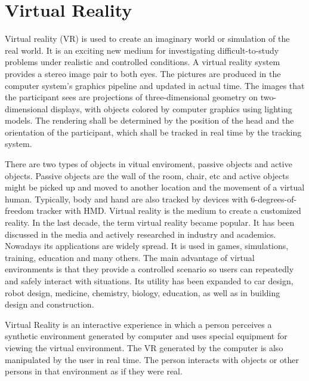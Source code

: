 \section{Virtual Reality}
Virtual reality (VR) is used to create an imaginary world or simulation of the real world. It is an exciting new medium for investigating difficult-to-study problems under realistic and controlled conditions. A virtual reality system provides a stereo image pair to both eyes. The pictures are produced in the computer system's graphics pipeline and updated in actual time. The images that the participant sees are projections of three-dimensional geometry on two-dimensional displays, with objects colored by computer graphics using lighting models. The rendering shall be determined by the position of the head and the orientation of the participant, which shall be tracked in real time by the tracking system.\cite{mandal2013brief}\par
There are two types of objects in vitual enviroment, passive objects and active objects. Passive objects are the wall of the room, chair, etc and active objects might be picked up and moved to another location and the movement of a virtual human. Typically, body and hand are also tracked by devices with 6-degrees-of-freedom tracker with HMD.
Virtual reality is the medium to create a customized reality. In the last decade, the term virtual reality became popular. It has been discussed in the media and actively researched in industry and academics. Nowadays its applications are widely spread. It is used in games, simulations, training, education and many others. The main advantage of virtual environments is that they provide a controlled scenario so users can repeatedly and safely interact with situations. Its utility has been expanded to car design, robot design, medicine, chemistry, biology, education, as well as in building design and construction.\cite{whyte2007visual}\par
Virtual Reality is an interactive experience in which a person perceives a synthetic environment generated by computer and uses special equipment for viewing the virtual environment. The VR generated by the computer is also manipulated by the user in real time. The person interacts with objects or other persons in that environment as if they were real.

